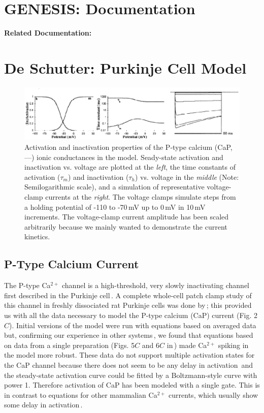 \documentclass[12pt]{article}
\begin{document}
\section*{GENESIS: Documentation}

{\bf Related Documentation:}

\section*{De Schutter: Purkinje Cell Model}

\begin{figure}[h]
\centering
   \includegraphics[scale=0.75]{figures/DS1.2C.eps}
   \caption{Activation and inactivation properties of the P-type calcium (CaP, ---) ionic conductances in the model. Seady-state activation and inactivation vs. voltage are plotted at the {\em left}, the time constants of activation ($\tau_m$) and inactivation ($\tau_h$) vs. voltage in the {\em middle} (Note: Semilogarithmic scale), and a simulation of representative voltage-clamp currents at the {\em right}. The voltage clamps simulate steps from a holding potential of -110 to -70\,mV up to 0\,mV in 10\,mV increments. The voltage-clamp current amplitude has been scaled arbitrarily because we mainly wanted to demonstrate the current kinetics.}
   \label{fig:DS1.2C}
\end{figure}

\subsection*{P-Type Calcium Current}

The P-type Ca$^{2+}$ channel is a high-threshold, very slowly inactivating channel first described in the Purkinje cell\,\cite{R:1980ly}. A complete whole-cell patch clamp study of this channel in freshly dissociated rat Purkinje cells was done by\,\cite{Regan:1991ly}; this provided us with all the data necessary to model the P-type calcium (CaP) current (Fig. 2$C$). Initial versions of the model were run with equations based on averaged data\,\cite{Regan:1991ly} but, confirming our experience in other systems\,\cite{De-Schutter-E:1993fu}, we found that equations based on data from a single preparation (Figs. 5$C$ and 6$C$ in\,\cite{Regan:1991ly}) made Ca$^{2+}$ spiking in the model more robust. These data do not support multiple activation states for the CaP channel because there does not seem to be any delay in activation\,\cite{hodgkin52:_quantitative_description} and the steady-state activation curve could be fitted by a Boltzmann-style curve with power 1. Therefore activation of CaP has been modeled with a single gate. This is in contrast to equations for other mammalian Ca$^{2+}$ currents, which usually show some delay in activation\,\cite{Chen:1990ve, Kay:1987ar}.
\end{document}

